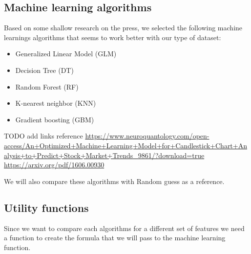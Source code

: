\documentclass[
]{article}
\begin{document}
\hypertarget{machine-learning-algorithms}{%
\subsection{Machine learning
algorithms}\label{machine-learning-algorithms}}

Based on some shallow research on the press, we selected the following
machine learnings algorithms that seems to work better with our type of
dataset:

\begin{itemize}
\item
  Generalized Linear Model (GLM)
\item
  Decision Tree (DT)
\item
  Random Forest (RF)
\item
  K-nearest neighbor (KNN)
\item
  Gradient boosting (GBM)
\end{itemize}

TODO add links reference
\url{https://www.neuroquantology.com/open-access/An+Optimized+Machine+Learning+Model+for+Candlestick+Chart+Analysis+to+Predict+Stock+Market+Trends_9861/?download=true}
\url{https://arxiv.org/pdf/1606.00930}

We will also compare these algorithms with Random guess as a reference.

\hypertarget{utility-functions}{%
\subsection{Utility functions}\label{utility-functions}}

Since we want to compare each algorithms for a different set of features
we need a function to create the formula that we will pass to the
machine learning function.
\end{document}

